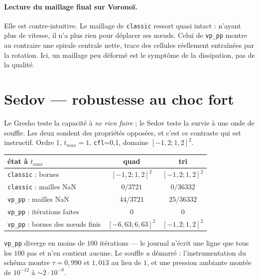 \documentclass[11pt,a4paper]{article}
\begin{document}
\paragraph{Lecture du maillage final sur Voronoï.} Elle est contre-intuitive.
Le maillage de \texttt{classic} ressort quasi intact : n'ayant plus de vitesse,
il n'a plus rien pour déplacer ses n\oe{}uds. Celui de \texttt{vp\_pp} montre
au contraire une spirale centrale nette, trace des cellules réellement
entraînées par la rotation. Ici, un maillage peu déformé est le symptôme de la
dissipation, pas de la qualité.

\clearpage
\section*{Sedov --- robustesse au choc fort}

Le Gresho teste la capacité à \emph{ne rien faire} ; le Sedov teste la survie à une onde
de souffle. Les deux sondent des propriétés opposées, et c'est ce contraste qui est
instructif. Ordre 1, $t_{max}=1$, \texttt{cfl}=0{,}1, domaine $[-1{,}2;1{,}2]^2$.

\begin{table}[H]\centering
\begin{tabular}{lcc}
\toprule
état à $t_{max}$ & quad & tri \\
\midrule
\texttt{classic} : bornes & $[-1{,}2;1{,}2]^2$ & $[-1{,}2;1{,}2]^2$ \\
\texttt{classic} : mailles NaN & $0/3721$ & $0/36332$ \\
\midrule
\texttt{vp\_pp} : mailles NaN & \textcolor{BrickRed}{$44/3721$} & \textcolor{BrickRed}{$25/36332$} \\
\texttt{vp\_pp} : itérations faites & \textcolor{BrickRed}{$0$} & \textcolor{BrickRed}{$0$} \\
\texttt{vp\_pp} : bornes des n\oe{}uds finis & \textcolor{BrickRed}{$[-6{,}63;6{,}63]^2$} & $[-1{,}2;1{,}2]^2$ \\
\bottomrule
\end{tabular}
\end{table}

\noindent
\texttt{vp\_pp} diverge en moins de $100$ itérations --- le journal n'écrit une
ligne que tous les $100$ pas et n'en contient aucune. Le souffle \emph{a} démarré :
l'instrumentation du schéma montre $\tau = 0{,}990$ et $1{,}013$ au lieu de $1$, et
une pression ambiante montée de $10^{-12}$ à $\sim\!2\cdot10^{-8}$.
\end{document}
